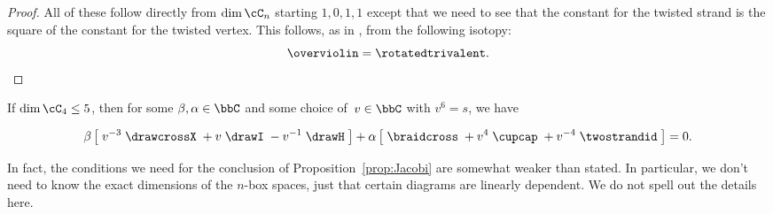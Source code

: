 \documentclass[12pt]{amsart}
\begin{document}
\begin{proof}
All of these follow directly from $\dim \cC_n$ starting $1,0,1,1$ except that we need to see that the constant for the twisted strand is the square of the constant for the twisted vertex.  This follows, as in \cite[Lemma 8.2]{MR3624901}, from the following isotopy:
\begin{equation*}
\overviolin = \rotatedtrivalent. \qedhere
\end{equation*}
\end{proof}

\begin{proposition}\label{prop:Jacobi}
If $\dim \cC_4 \leq 5$, then for some $\beta, \alpha \in \bbC$ and some choice of~$v \in \bbC$ with $v^6 = s$, we have

\begin{equation}
\beta \left[\; v^{-3} \;
\drawcrossX
\;+ v \;
\drawI
\; -v^{-1} \;
 \drawH
\;\right]
 + \alpha
\left[\; \braidcross \;
 + v^{4}\;
\cupcap
\; + v^{-4} \;
 \twostrandid \;
 \right] = 0.\label{eq:quant-except-init}
 \end{equation}
\end{proposition}

In fact, the conditions we need for the conclusion of
Proposition~\ref{prop:Jacobi} are somewhat weaker than stated. In
particular, we don't need to know the exact dimensions of the $n$-box spaces, just
that certain diagrams are linearly dependent. We do not spell out the details here.
\end{document}
